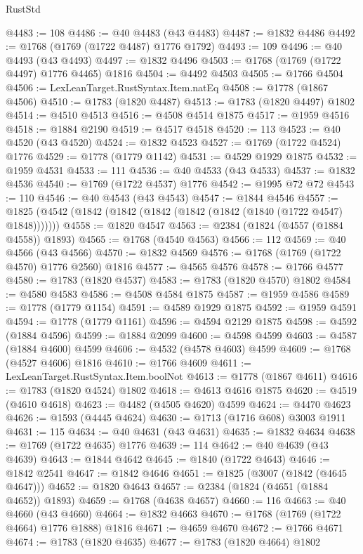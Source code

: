 \begin{lexlean}{RustStd}
\begin{coremodule}
@4483 := 108
@4486 := @40 @4483 (@43 @4483)
@4487 := @1832 @4486
@4492 := @1768 (@1769 (@1722 @4487) @1776 @1792)
@4493 := 109
@4496 := @40 @4493 (@43 @4493)
@4497 := @1832 @4496
@4503 := @1768 (@1769 (@1722 @4497) @1776 @4465) @1816
@4504 := @4492 @4503
@4505 := @1766 @4504
@4506 := LexLeanTarget.RustSyntax.Item.natEq
@4508 := @1778 (@1867 @4506)
@4510 := @1783 (@1820 @4487)
@4513 := @1783 (@1820 @4497) @1802
@4514 := @4510 @4513
@4516 := @4508 @4514 @1875
@4517 := @1959 @4516
@4518 := @1884 @2190
@4519 := @4517 @4518
@4520 := 113
@4523 := @40 @4520 (@43 @4520)
@4524 := @1832 @4523
@4527 := @1769 (@1722 @4524) @1776
@4529 := @1778 (@1779 @1142)
@4531 := @4529 @1929 @1875
@4532 := @1959 @4531
@4533 := 111
@4536 := @40 @4533 (@43 @4533)
@4537 := @1832 @4536
@4540 := @1769 (@1722 @4537) @1776
@4542 := @1995 @72 @72
@4543 := 110
@4546 := @40 @4543 (@43 @4543)
@4547 := @1844 @4546
@4557 := @1825 (@4542 (@1842 (@1842 (@1842 (@1842 (@1842 (@1840 (@1722 @4547) @1848)))))))
@4558 := @1820 @4547
@4563 := @2384 (@1824 (@4557 (@1884 @4558)) @1893)
@4565 := @1768 (@4540 @4563)
@4566 := 112
@4569 := @40 @4566 (@43 @4566)
@4570 := @1832 @4569
@4576 := @1768 (@1769 (@1722 @4570) @1776 @2560) @1816
@4577 := @4565 @4576
@4578 := @1766 @4577
@4580 := @1783 (@1820 @4537)
@4583 := @1783 (@1820 @4570) @1802
@4584 := @4580 @4583
@4586 := @4508 @4584 @1875
@4587 := @1959 @4586
@4589 := @1778 (@1779 @1154)
@4591 := @4589 @1929 @1875
@4592 := @1959 @4591
@4594 := @1778 (@1779 @1161)
@4596 := @4594 @2129 @1875
@4598 := @4592 (@1884 @4596)
@4599 := @1884 @2099
@4600 := @4598 @4599
@4603 := @4587 (@1884 @4600) @4599
@4606 := @4532 (@4578 @4603) @4599
@4609 := @1768 (@4527 @4606) @1816
@4610 := @1766 @4609
@4611 := LexLeanTarget.RustSyntax.Item.boolNot
@4613 := @1778 (@1867 @4611)
@4616 := @1783 (@1820 @4524) @1802
@4618 := @4613 @4616 @1875
@4620 := @4519 (@4610 @4618)
@4623 := @4482 (@4505 @4620) @4599
@4624 := @4470 @4623
@4626 := @1593 (@4445 @4624)
@4630 := @1713 (@1716 @608) @3003 @1911
@4631 := 115
@4634 := @40 @4631 (@43 @4631)
@4635 := @1832 @4634
@4638 := @1769 (@1722 @4635) @1776
@4639 := 114
@4642 := @40 @4639 (@43 @4639)
@4643 := @1844 @4642
@4645 := @1840 (@1722 @4643)
@4646 := @1842 @2541
@4647 := @1842 @4646
@4651 := @1825 (@3007 (@1842 (@4645 @4647)))
@4652 := @1820 @4643
@4657 := @2384 (@1824 (@4651 (@1884 @4652)) @1893)
@4659 := @1768 (@4638 @4657)
@4660 := 116
@4663 := @40 @4660 (@43 @4660)
@4664 := @1832 @4663
@4670 := @1768 (@1769 (@1722 @4664) @1776 @1888) @1816
@4671 := @4659 @4670
@4672 := @1766 @4671
@4674 := @1783 (@1820 @4635)
@4677 := @1783 (@1820 @4664) @1802

\end{coremodule}
\end{lexlean}
